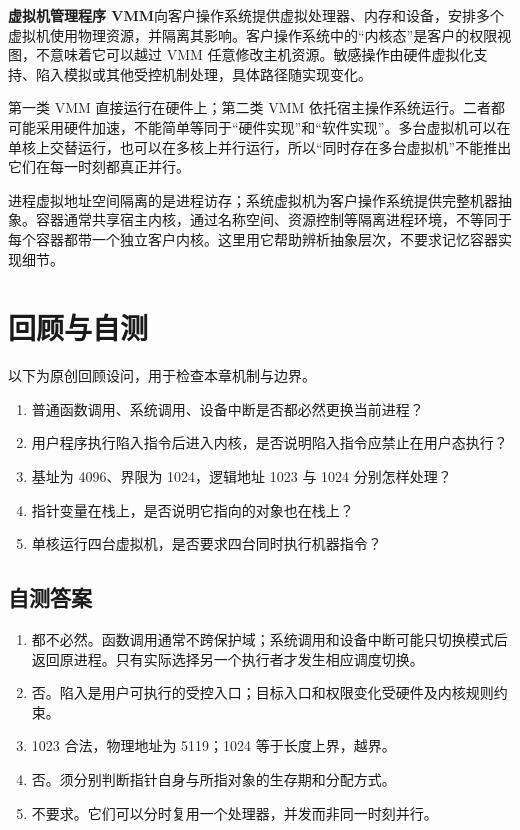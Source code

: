 \textbf{虚拟机管理程序 VMM}向客户操作系统提供虚拟处理器、内存和设备，安排多个虚拟机使用物理资源，并隔离其影响。客户操作系统中的``内核态''是客户的权限视图，不意味着它可以越过 VMM 任意修改主机资源。敏感操作由硬件虚拟化支持、陷入模拟或其他受控机制处理，具体路径随实现变化。

第一类 VMM 直接运行在硬件上；第二类 VMM 依托宿主操作系统运行。二者都可能采用硬件加速，不能简单等同于``硬件实现''和``软件实现''。多台虚拟机可以在单核上交替运行，也可以在多核上并行运行，所以``同时存在多台虚拟机''不能推出它们在每一时刻都真正并行。

进程虚拟地址空间隔离的是进程访存；系统虚拟机为客户操作系统提供完整机器抽象。容器通常共享宿主内核，通过名称空间、资源控制等隔离进程环境，不等同于每个容器都带一个独立客户内核。这里用它帮助辨析抽象层次，不要求记忆容器实现细节。

\section{回顾与自测}\label{os-1-review}

以下为原创回顾设问，用于检查本章机制与边界。

\begin{enumerate}
\def\labelenumi{\arabic{enumi}.}
\tightlist
\item
  普通函数调用、系统调用、设备中断是否都必然更换当前进程？
\item
  用户程序执行陷入指令后进入内核，是否说明陷入指令应禁止在用户态执行？
\item
  基址为 4096、界限为 1024，逻辑地址 1023 与 1024 分别怎样处理？
\item
  指针变量在栈上，是否说明它指向的对象也在栈上？
\item
  单核运行四台虚拟机，是否要求四台同时执行机器指令？
\end{enumerate}

\subsection{自测答案}\label{os-c01-h180}

\begin{enumerate}
\def\labelenumi{\arabic{enumi}.}
\tightlist
\item
  都不必然。函数调用通常不跨保护域；系统调用和设备中断可能只切换模式后返回原进程。只有实际选择另一个执行者才发生相应调度切换。
\item
  否。陷入是用户可执行的受控入口；目标入口和权限变化受硬件及内核规则约束。
\item
  1023 合法，物理地址为 5119；1024 等于长度上界，越界。
\item
  否。须分别判断指针自身与所指对象的生存期和分配方式。
\item
  不要求。它们可以分时复用一个处理器，并发而非同一时刻并行。
\end{enumerate}

